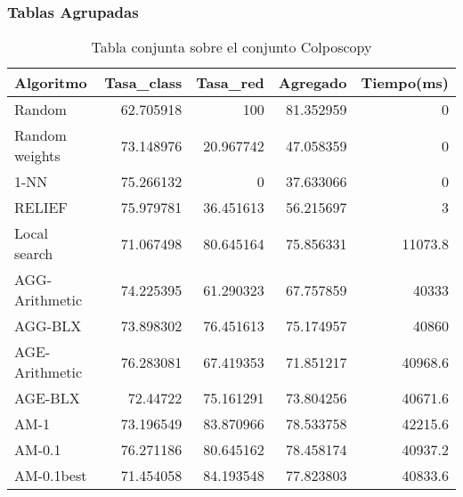 \documentclass[size=a4, parskip=half, titlepage=false, toc=flat, toc=bib, 12pt]{scrartcl}
\begin{document}
\newpage

\subsubsection{Tablas Agrupadas}

 \begin{table}[ht]
  \centering
  \begin{tabular}[t]{lrrrr}
  \toprule
  Algoritmo &Tasa\_class &Tasa\_red & Agregado & Tiempo(ms)\\
  \midrule
 Random             & 62.705918 & 100 & 81.352959 & 0\\
 Random weights     & 73.148976 & 20.967742 & 47.058359 & 0\\
 1-NN               & 75.266132 & 0 & 37.633066 & 0\\
 RELIEF             & 75.979781 & 36.451613 & 56.215697 & 3\\
 Local search       & 71.067498 & 80.645164 & 75.856331 & 11073.8\\
     AGG-Arithmetic& 74.225395 & 61.290323 & 67.757859 &  40333 \\
     AGG-BLX& 73.898302 & 76.451613 & 75.174957 &  40860 \\
     AGE-Arithmetic& 76.283081 & 67.419353 & 71.851217 & 40968.6 \\
     AGE-BLX&  72.44722 & 75.161291 & 73.804256 & 40671.6 \\
     AM-1& 73.196549 & 83.870966 & 78.533758 & 42215.6 \\
     AM-0.1& 76.271186 & 80.645162 & 78.458174 & 40937.2 \\
     AM-0.1best& 71.454058 & 84.193548 & 77.823803 & 40833.6 \\

  \bottomrule
  \end{tabular}
  \caption{Tabla conjunta sobre el conjunto Colposcopy }
  \end{table}%
\newpage
\end{document}
